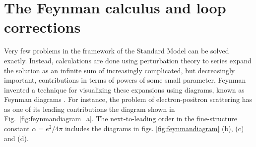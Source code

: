 \documentclass[twoside,english]{uiofysmaster}
\begin{document}
\section{The Feynman calculus and loop corrections}
\label{subsec:feynmancalculus}
Very few problems in the framework of the Standard Model can be solved exactly. Instead, calculations are done using perturbation theory to series expand the solution as an infinite sum of increasingly complicated, but decreasingly important, contributions in terms of powers of some small parameter. Feynman invented a technique for visualizing these expansions using diagrams, known as Feynman diagrams \cite{2005AmericanScientist}. For instance, the problem of electron-positron scattering has as one of its leading contributions the diagram shown in Fig.\  \ref{fig:feynmandiagram_a}. The next-to-leading order in the fine-structure constant $\alpha = e^2/4\pi$ includes the diagrams in figs. \ref{fig:feynmandiagram} (b), (c) and (d).
\end{document}

